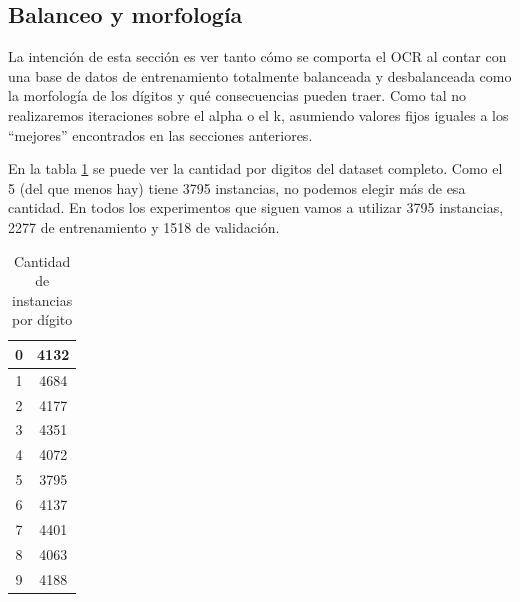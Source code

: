 \subsection{Balanceo y morfología}
La intención de esta sección es ver tanto cómo se comporta el OCR al contar con una base de datos de entrenamiento totalmente balanceada y desbalanceada como la morfología de los dígitos y qué consecuencias pueden traer. Como tal no realizaremos iteraciones sobre el alpha o el k, asumiendo valores fijos iguales a los ``mejores'' encontrados en las secciones anteriores.

En la tabla \ref{tab:totalDigitos} se puede ver la cantidad por digitos del dataset completo. Como el 5 (del que menos hay) tiene 3795 instancias, no podemos elegir más de esa cantidad. En todos los experimentos que siguen vamos a utilizar 3795 instancias, 2277 de entrenamiento y 1518 de validación.

\begin{table}[h]
\centering
\begin{tabular}{|c|c|}
\hline
0 & 4132 \\ \hline
1 & 4684 \\ \hline
2 & 4177 \\ \hline
3 & 4351 \\ \hline
4 & 4072 \\ \hline
5 & 3795 \\ \hline
6 & 4137 \\ \hline
7 & 4401 \\ \hline
8 & 4063 \\ \hline
9 & 4188 \\ \hline
\end{tabular}
\caption{Cantidad de instancias por dígito}
\label{tab:totalDigitos}
\end{table}

